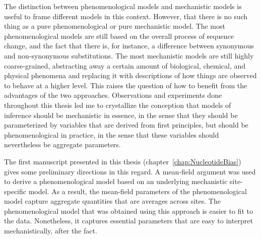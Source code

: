 The distinction between phenomenological models and mechanistic models is useful to frame different models in this context.
However, that there is no such thing as a pure phenomenological or pure mechanistic model.
The most phenomenological models are still based on the overall process of sequence change, and the fact that there is, for instance, a difference between synonymous and non-synonymous substitutions.
The most mechanistic models are still highly coarse-grained, abstracting away a certain amount of biological, chemical, and physical phenomena and replacing it with descriptions of how things are observed to behave at a higher level.
This raises the question of how to benefit from the advantages of the two approaches.
Observations and experiments done throughout this thesis led me to crystallize the conception that models of inference should be mechanistic in essence, in the sense that they should be parameterized by variables that are derived from first principles, but should be phenomenological in practice, in the sense that these variables should nevertheless be aggregate parameters.

The first manuscript presented in this thesis (chapter~\ref{chap:NucleotideBias}) gives some preliminary directions in this regard.
A mean-field argument was used to derive a phenomenological model based on an underlying mechanistic site-specific model.
As a result, the mean-field parameters of the phenomenological model capture aggregate quantities that are averages across sites.
The phenomenological model that was obtained using this approach is easier to fit to the data.
Nonetheless, it captures essential parameters that are easy to interpret mechanistically, after the fact.

